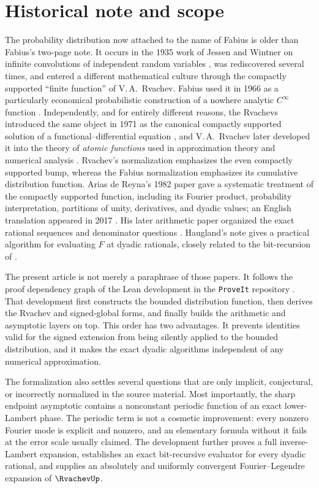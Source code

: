 \documentclass[11pt,oneside]{article}
\theoremstyle{definition}
\theoremstyle{remark}
\begin{document}
\tableofcontents
\newpage


\section{Historical note and scope}
\label{sec:history}

The probability distribution now attached to the name of Fabius is older than Fabius's
two-page note.  It occurs in the 1935 work of Jessen and Wintner on infinite convolutions
of independent random variables \cite{jessen1935}, was
rediscovered several times, and entered a different mathematical culture through the
compactly supported ``finite function'' of V.\,A.~Rvachev.  Fabius used it in 1966 as a
particularly economical probabilistic construction of a nowhere analytic
$C^\infty$ function \cite{fabius1966}.  Independently, and for entirely different reasons,
the Rvachevs introduced the same object in 1971 as the canonical compactly supported
solution of a functional--differential equation \cite{rvachev1971}, and V.\,A.~Rvachev
later developed it into the theory of \emph{atomic functions} used in approximation
theory and numerical analysis \cite{rvachev1973,rvachev1979,rvachev1990}.  Rvachev's
normalization emphasizes the even compactly
supported bump, whereas the Fabius normalization emphasizes its cumulative distribution
function.  Arias de Reyna's 1982 paper gave a systematic treatment of the compactly supported
function, including its Fourier product, probability interpretation, partitions of unity,
derivatives, and dyadic values; an English translation appeared in 2017
\cite{arias1982}.  His later arithmetic paper organized the exact rational sequences and
denominator questions \cite{arias2018}.  Haugland's note \cite{haugland2016} gives a
practical algorithm for evaluating $F$ at dyadic rationals, closely related to the
bit-recursion of .

The present article is not merely a paraphrase of those papers.  It follows the proof
dependency graph of the Lean development in the \texttt{ProveIt} repository
\cite{proveit}.  That development first constructs the bounded distribution function, then
derives the Rvachev and signed-global forms, and finally builds the arithmetic and asymptotic
layers on top.  This order has two advantages.  It prevents identities valid for the signed
extension from being silently applied to the bounded distribution, and it makes the exact
dyadic algorithms independent of any numerical approximation.

The formalization also settles several questions that are only implicit, conjectural, or
incorrectly normalized in the source material.  Most importantly, the sharp endpoint
asymptotic contains a nonconstant periodic function of an exact lower-Lambert phase.  The
periodic term is not a cosmetic improvement: every nonzero Fourier mode is explicit and
nonzero, and an elementary formula without it fails at the error scale usually claimed.
The development further proves a full inverse-Lambert expansion, establishes an exact
bit-recursive evaluator for every dyadic rational, and supplies an absolutely and uniformly
convergent Fourier--Legendre expansion of $\RvachevUp$.
\end{document}
